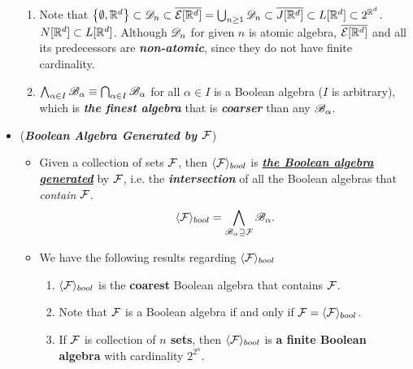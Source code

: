 \documentclass[11pt]{article}
\begin{document}
\begin{itemize}
\begin{example}
\begin{enumerate}
\item Note that $\left\{\emptyset,{\mathbb R}^{d}\right\}\subset {\mathscr D}_{n}\subset \overline{{\mathcal E}[{\mathbb R}^{d}]} = \bigcup_{n\ge 1}{\mathscr D}_{n} \subset \overline{J[{\mathbb R}^{d}]} \subset L[{\mathbb R}^{d}]  \subset 2^{{\mathbb R}^{d}}$. $N[{\mathbb R}^{d}]\subset L[{\mathbb R}^{d}]$. Although ${\mathscr D}_{n}$ for given $n$ is atomic algebra, $\overline{{\mathcal E}[{\mathbb R}^{d}]}$ and all its predecessors are \emph{\textbf{non-atomic}}, since they do not have finite cardinality. 

\item $\bigwedge_{\alpha\in I}{\mathscr B}_{\alpha}\equiv \bigcap_{\alpha\in I}{\mathscr B}_{\alpha}$ for all $\alpha\in I$ is a Boolean algebra ($I$ is arbitrary), which is \emph{\textbf{the finest algebra}} that is \emph{\textbf{coarser}} than any ${\mathscr B}_{\alpha}$.  
\end{enumerate}
\end{example}

\item \begin{example} (\emph{\textbf{Boolean Algebra Generated by ${\mathcal F}$}})
\begin{itemize}
\item \begin{definition}
Given a collection of sets ${\mathcal F}$, then $\langle {\mathcal F} \rangle_{bool}$ is \underline{\emph{\textbf{the Boolean algebra generated}}} by ${\mathcal F}$, i.e. the \emph{\textbf{intersection}} of all the Boolean algebras that \emph{contain} ${\mathcal F}$. 
\begin{align*}
\langle {\mathcal F} \rangle_{bool} = \bigwedge_{{\mathscr B}_{\alpha} \supseteq {\mathcal F}}{\mathscr B}_{\alpha}.
\end{align*} 
\end{definition}

\item \begin{proposition}
We have the following results regarding $\langle {\mathcal F} \rangle_{bool}$
\begin{enumerate}
\item $\langle {\mathcal F} \rangle_{bool}$ is the \textbf{coarest} Boolean algebra that contains ${\mathcal F}$.
\item Note that ${\mathcal F}$ is a Boolean algebra if and only if ${\mathcal F} = \langle {\mathcal F} \rangle_{bool}$.
\item If ${\mathcal F}$ is collection of \textbf{$n$ sets}, then $\langle {\mathcal F} \rangle_{bool}$ is \textbf{a finite Boolean algebra} with cardinality $2^{2^{n}}$.
\end{enumerate}
\end{proposition}


\end{itemize}
\end{example}
\end{itemize}
\end{document}
